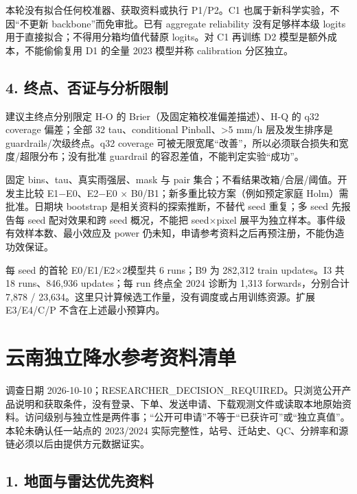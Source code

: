 \documentclass[UTF8,fontset=fandol,10pt]{ctexart}
\begin{document}
本轮没有拟合任何校准器、获取资料或执行 P1/\allowbreak{}P2。C1 也属于新科学实验，不因“不更新 backbone”而免审批。已有 aggregate reliability 没有足够样本级 logits 用于直接拟合；不得用分箱均值代替原 logits。对 C1 再训练 D2 模型是额外成本，不能偷偷复用 D1 的全量 2023 模型并称 calibration 分区独立。

\subsection{4. 终点、否证与分析限制}

建议主终点分别限定 H-O 的 Brier（及固定箱校准偏差描述）、H-Q 的 q32 coverage 偏差；全部 32 tau、conditional Pinball、>5 mm/\allowbreak{}h 层及发生排序是 guardrails/\allowbreak{}次级终点。q32 coverage 可被无限宽尾“改善”，所以必须联合损失和宽度/\allowbreak{}超限分布；没有批准 guardrail 的容忍差值，不能判定实验“成功”。

固定 bins、tau、真实雨强层、mask 与 pair 集合；不看结果改箱/\allowbreak{}合层/\allowbreak{}阈值。开发主比较 E1\(-\)E0、E2\(-\)E0 \(\times\) B0/\allowbreak{}B1；新多重比较方案（例如预定家庭 Holm）需批准。日期块 bootstrap 是相关资料的探索推断，不替代 seed 重复；多 seed 先报告每 seed 配对效果和跨 seed 概况，不能把 seed\(\times\)pixel 展平为独立样本。事件级有效样本数、最小效应及 power 仍未知，申请参考资料之后再预注册，不能伪造功效保证。

每 seed 的首轮 E0/\allowbreak{}E1/\allowbreak{}E2\(\times\)2模型共 6 runs；B9 为 282,312 train updates。I3 共 18 runs、846,936 updates；每 run 终点全 2024 诊断为 1,313 forwards，分别合计 7,878 /\allowbreak{} 23,634。这里只计算候选工作量，没有调度或占用训练资源。扩展 E3/\allowbreak{}E4/\allowbreak{}C/\allowbreak{}P 不含在上述最小预算内。
\clearpage\section{云南独立降水参考资料清单}

调查日期 2026-10-10；RESEARCHER\_\allowbreak{}DECISION\_\allowbreak{}REQUIRED。只浏览公开产品说明和获取条件，没有登录、下单、发送申请、下载观测文件或读取本地原始资料。访问级别与独立性是两件事；“公开可申请”不等于“已获许可”或“独立真值”。本轮未确认任一站点的 2023/\allowbreak{}2024 实际完整性，站号、迁站史、QC、分辨率和源链必须以后由提供方元数据证实。

\subsection{1. 地面与雷达优先资料}
\end{document}
